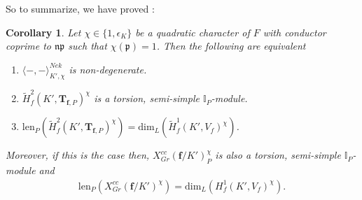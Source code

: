 \documentclass[reqno,10pt]{amsart}
\newcommand{\I}{\mathbb{I}}
\newcommand{\f}{\mathbf{f}}
\newcommand{\T}{\mathbf{T}}
\newcommand{\p}{\mathfrak{p}}
\newcommand{\n}{\mathfrak{n}}
\newcommand{\ip}{\I_P}
\theoremstyle{plain}
\newtheorem{cor}[thm]{Corollary}
\theoremstyle{definition}
\begin{document}
So to summarize, we have proved :
\begin{cor} \label{NonDegeneracyEquivalence}
    Let $\chi \in \{1, \epsilon_K\}$ be a quadratic character of $F$ with conductor coprime to $\n\p$ such that $\chi(\p) = 1$. Then  the following are equivalent
    \begin{enumerate}
        \item $\langle -,- \rangle^{Nek}_{K',\chi}$ is non-degenerate.
        \item $\widetilde{H}^2_f(K',\T_{\f,P})^\chi$ is a torsion, semi-simple $\ip$-module.
        \item $\mathrm{len}_P(\widetilde{H}^2_f(K',\T_{\f,P})^\chi) = \mathrm{dim}_L(\widetilde{H}^1_f(K',V_f)^\chi)$.
    \end{enumerate}
    Moreover, if this is the case then, $X_{Gr}^{cc}(\f/K')^\chi_P$ is also a torsion, semi-simple $\ip$-module and
    \begin{align*}
        \mathrm{len}_P(X^{cc}_{Gr}(\f/K')^\chi) = \mathrm{dim}_L(H^1_f(K',V_f)^\chi).
    \end{align*}
\end{cor}
\end{document}
